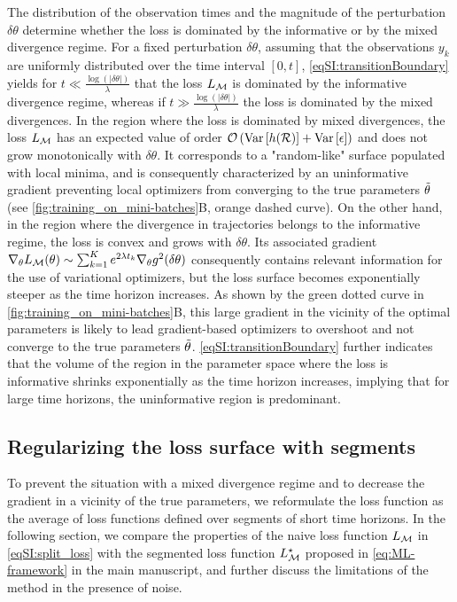 The distribution of the observation times and the magnitude of the perturbation $\delta \theta$ determine whether the loss is dominated by the informative or by the mixed divergence regime. 
% 
For a fixed perturbation $\delta \theta$, assuming that the observations $y_{k}$ are uniformly distributed over the time interval $\left[0, t \right]$, \cref{eqSI:transitionBoundary} yields for $t \ll \frac{\log(|\delta\theta|)}{\lambda}$ that the loss $L_{\mathcal{M}}$ is dominated by the informative divergence regime, whereas if $t  \gg \frac{\log(|\delta\theta|)}{\lambda}$ the loss is dominated by the mixed divergences. 
% 
In the region where the loss is dominated by mixed divergences, the loss $L_{\mathcal{M}}$ has an expected value of order $\mathcal{O}\left({\operatorname{Var}}\left[h(\mathcal{R})\right] + {\operatorname{Var}}\left[\epsilon\right]\right)$ and does not grow monotonically with $\delta \theta$. It corresponds to a "random-like" surface populated with local minima, and is consequently characterized by an uninformative gradient preventing local optimizers from converging to the true parameters $\Tilde \theta$ (see \cref{fig:training_on_mini-batches}B, orange dashed curve).
% 
On the other hand, in the region where the divergence in trajectories belongs to the informative regime, the loss is convex and grows with $\delta \theta$. Its associated gradient $\nabla_\theta L_{\mathcal{M}}(\theta) \sim \sum_{k=1}^{K} e^{2\lambda t_k} \nabla_\theta g^2(\delta \theta)$ consequently contains relevant information for the use of variational optimizers, but the loss surface becomes exponentially steeper as the time horizon increases.
As shown by the green dotted curve in \cref{fig:training_on_mini-batches}B, this large gradient in the vicinity of the optimal parameters is likely to lead gradient-based optimizers to overshoot and not converge to the true parameters $\Tilde \theta$.
% 
\cref{eqSI:transitionBoundary} further indicates that the volume of the region in the parameter space where the loss is informative shrinks exponentially as the time horizon increases, implying that for large time horizons, the uninformative region is predominant.

\subsection{Regularizing the loss surface with segments}
% 
To prevent the situation with a mixed divergence regime and to decrease the gradient in a vicinity of the true parameters, we reformulate the loss function as the average of loss functions defined over segments of short time horizons. In the following section, we compare the properties of the naive loss function $L_{\mathcal{M}}$ in \cref{eqSI:split_loss} with the segmented loss function $L^\star_{\mathcal{M}}$ proposed in \cref{eq:ML-framework} in the main manuscript, and further discuss the limitations of the method in the presence of noise.


